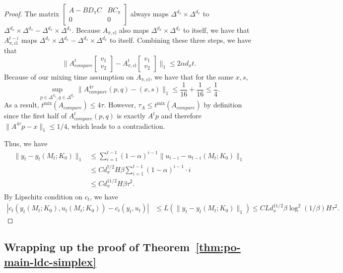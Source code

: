 \begin{proof}
The matrix $\begin{bmatrix}
A-BD_{\pi}C & B C_{\pi} \\
 0 & 0
\end{bmatrix}$ always maps $\Delta^{d_x} \times \Delta^{d_x}$ to $\Delta^{d_x} \times \Delta^{d_x}-\Delta^{d_x} \times \Delta^{d_x}$. Because $A_{\pi,\mathrm{cl}}$ also maps $\Delta^{d_x} \times \Delta^{d_x}$ to itself, we have that $A_{\pi,\mathrm{cl}}^{t-i}$ maps $\Delta^{d_x} \times \Delta^{d_x}-\Delta^{d_x} \times \Delta^{d_x}$ to itself. Combining these three steps, we have that
$$
\| A_{compare}^t \begin{bmatrix}
v_1 \\
v_2
\end{bmatrix}-   A_{\pi,\mathrm{cl}}^t \begin{bmatrix}
v_1 \\
v_2
\end{bmatrix}\|_1\le 2\alpha d_x t.
$$
Because of our mixing time assumption on $A_{\pi,\mathrm{cl}}$, we have that for the same $x,s$,
$$
\sup_{p\in\Delta^{d_x},q\in\Delta^{d_x}}\|A_{compare}^{4\tau}(p,q)-(x,s)\|_1\le \frac{1}{16}+\frac{1}{16}\le \frac{1}{4}.
$$
As a result, $t^{\text{mix}}(A_{compare})\le 4\tau$. However, $\tau_A\le t^{\text{mix}}(A_{compare})$ by definition since the first half of $A_{compare}^{t}(p,q)$ is exactly $A^t p$ and therefore $\|A^{4\tau}p-x\|_1\le 1/4$, which leads to a contradiction.



Thus, we have
\begin{align*}
\|y_t-y_t(M_t;K_0)\|_1&\le \sum_{i=1}^{t-1}(1-\alpha)^{i-1}\|u_{t-i}-u_{t-i}(M_t;K_0)\|_1\\
&\le Cd_x^{7/2}H\beta\sum_{i=1}^{t-1}(1-\alpha)^{i-1}\cdot i\\
&\le Cd_x^{11/2}H\beta \tau^2.\\
\end{align*}
By Lipschitz condition on $c_t$, we have
\begin{align*}
|c_t(y_t(M_t;K_0),u_t(M_t;K_0))-c_t(y_t,u_t)|&\le L(\|y_t-y_t(M_t;K_0)\|_1)\le C L d_x^{11/2} \beta\log^2(1/\beta)H\tau^2.
\end{align*}
\end{proof}

\subsection{Wrapping up the proof of Theorem~\ref{thm:po-main-ldc-simplex}}\label{sec:po-proof-nonmarkov}

